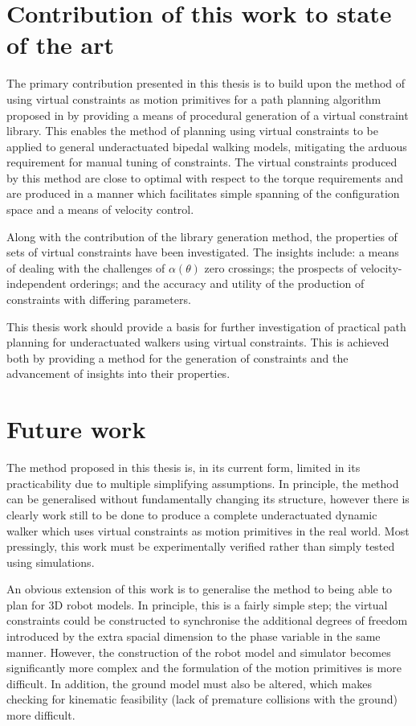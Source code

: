\section{Contribution of this work to state of the art}
The primary contribution presented in this thesis is to build upon the method of using virtual constraints as motion primitives for a path planning algorithm proposed in \cite{manchester13planning} by providing a means of procedural generation of a virtual constraint library. This enables the method of planning using virtual constraints to be applied to general underactuated bipedal walking models, mitigating the arduous requirement for manual tuning of constraints. The virtual constraints produced by this method are close to optimal with respect to the torque requirements and are produced in a manner which facilitates simple spanning of the configuration space and a means of velocity control.

Along with the contribution of the library generation method, the properties of sets of virtual constraints have been investigated. The insights include: a means of dealing with the challenges of $\alpha(\theta)$ zero crossings; the prospects of velocity-independent orderings; and the accuracy and utility of the production of constraints with differing parameters.

This thesis work should provide a basis for further investigation of practical path planning for underactuated walkers using virtual constraints. This is achieved both by providing a method for the generation of constraints and the advancement of insights into their properties.

\section{Future work}
The method proposed in this thesis is, in its current form, limited in its practicability due to multiple simplifying assumptions. In principle, the method can be generalised without fundamentally changing its structure, however there is clearly work still to be done to produce a complete underactuated dynamic walker which uses virtual constraints as motion primitives in the real world. Most pressingly, this work must be experimentally verified rather than simply tested using simulations.

An obvious extension of this work is to generalise the method to being able to plan for 3D robot models. In principle, this is a fairly simple step; the virtual constraints could be constructed to synchronise the additional degrees of freedom introduced by the extra spacial dimension to the phase variable in the same manner. However, the construction of the robot model and simulator becomes significantly more complex and the formulation of the motion primitives is more difficult. In addition, the ground model must also be altered, which makes checking for kinematic feasibility (lack of premature collisions with the ground) more difficult. 

